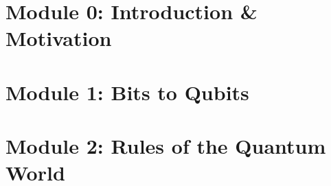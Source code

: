 
\section[Intro]{Module 0: Introduction \& Motivation}


\section[Bits]{Module 1: Bits to Qubits}


\section[Rules]{Module 2: Rules of the Quantum World}

